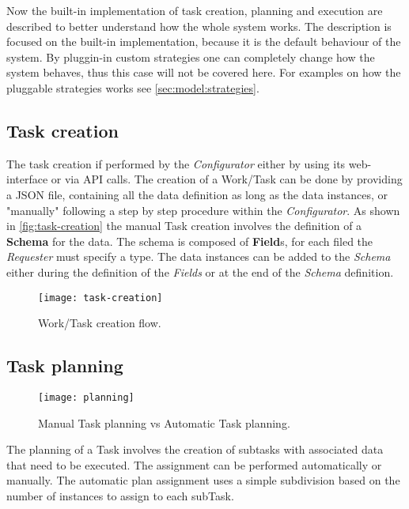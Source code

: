 


Now the built-in implementation of task creation, planning and execution are
described to better understand how the whole system works. The description is
focused on the built-in implementation, because it is the default behaviour of
the system. By pluggin-in custom strategies one can completely change how the
system behaves, thus this case will not be covered here. For examples on how the
pluggable strategies works see \ref{sec:model:strategies}.

\subsection{Task creation}
The task creation if performed by the \emph{Configurator} either by using its
web-interface or via API calls. The creation of a Work/Task can be done by
providing a JSON file, containing all the data definition as long as the data
instances, or "manually" following a step by step procedure within the
\emph{Configurator}. As shown in \autoref{fig:task-creation} the manual Task
creation involves the definition of a \textbf{Schema} for the data. The schema
is composed of \textbf{Field}s, for each filed the \emph{Requester} must specify
a type. The data instances can be added to the \emph{Schema} either during the
definition of the \emph{Fields} or at the end of the \emph{Schema} definition.

\begin{figure}[htb]
    \centering
    \texttt{[image: task-creation]}
    \caption{Work/Task creation flow.}
    \label{fig:task-creation}
\end{figure}



\subsection{Task planning}
\begin{figure}[htb]
    \centering
    \texttt{[image: planning]}
    \caption{Manual Task planning vs Automatic Task planning.}
    \label{fig:auto-manual-planning}
\end{figure}
The planning of a Task involves the creation of subtasks with associated data
that need to be executed. The assignment can be performed automatically or
manually. The automatic plan assignment uses a simple subdivision based on the
number of instances to assign to each subTask.


